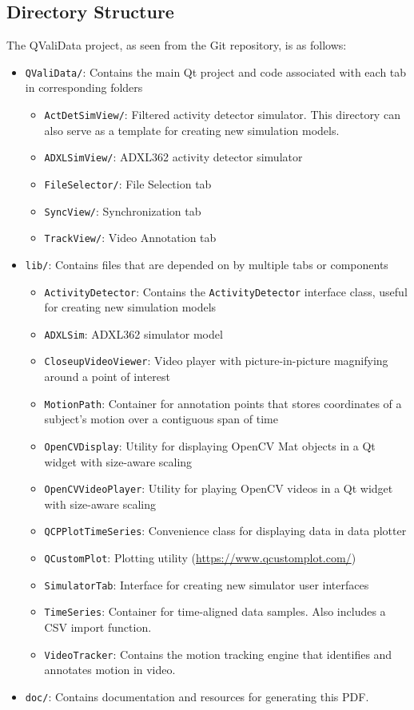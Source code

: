 \documentclass[]{article}
\begin{document}
	\subsection{Directory Structure}
	The QValiData project, as seen from the Git repository, is as follows:
		\begin{itemize}
			\item \texttt{QValiData/}: Contains the main Qt project and code associated with each tab in corresponding folders
				\begin{itemize}
					\item \texttt{ActDetSimView/}: Filtered activity detector simulator. This directory can also serve as a template for creating new simulation models.
					\item \texttt{ADXLSimView/}: ADXL362 activity detector simulator
					\item \texttt{FileSelector/}: File Selection tab
					\item \texttt{SyncView/}: Synchronization tab
					\item \texttt{TrackView/}: Video Annotation tab
				\end{itemize}
			\item \texttt{lib/}: Contains files that are depended on by multiple tabs or components
				\begin{itemize}
					\item \texttt{ActivityDetector}: Contains the \texttt{ActivityDetector} interface class, useful for creating new simulation models
					\item \texttt{ADXLSim}: ADXL362 simulator model
					\item \texttt{CloseupVideoViewer}: Video player with picture-in-picture magnifying around a point of interest
					\item \texttt{MotionPath}: Container for annotation points that stores coordinates of a subject's motion over a contiguous span of time
					\item \texttt{OpenCVDisplay}: Utility for displaying OpenCV Mat objects in a Qt widget with size-aware scaling
					\item \texttt{OpenCVVideoPlayer}: Utility for playing OpenCV videos in a Qt widget with size-aware scaling
					\item \texttt{QCPPlotTimeSeries}: Convenience class for displaying data in data plotter
					\item \texttt{QCustomPlot}: Plotting utility (\href{https://www.qcustomplot.com/}{https://www.qcustomplot.com/})
					\item \texttt{SimulatorTab}: Interface for creating new simulator user interfaces
					\item \texttt{TimeSeries}: Container for time-aligned data samples. Also includes a CSV import function.
					\item \texttt{VideoTracker}: Contains the motion tracking engine that identifies and annotates motion in video.
				\end{itemize}
			\item \texttt{doc/}: Contains documentation and resources for generating this PDF.
		\end{itemize}
		\newpage
\end{document}
